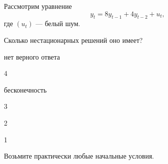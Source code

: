 
\begin{question}
Рассмотрим уравнение
\[
y_t = 8 y_{t-1} + 4 y_{t-2} + u_t,
\]
где \((u_t)\) --- белый шум.

Сколько нестационарных решений оно имеет?
\begin{answerlist}
  \item нет верного ответа
  \item 4
  \item бесконечность
  \item 3
  \item 2
  \item 1
\end{answerlist}
\end{question}

\begin{solution}
Возьмите практически любые начальные условия.
\end{solution}


